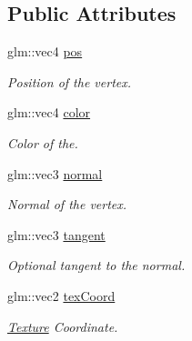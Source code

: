 \subsection*{Public Attributes}
\begin{DoxyCompactItemize}
\item 
\mbox{\label{struct_vertex_a516f575596de99880ec990ac15027f94}} 
glm\+::vec4 \mbox{\hyperlink{struct_vertex_a516f575596de99880ec990ac15027f94}{pos}}
\begin{DoxyCompactList}\small\item\em Position of the vertex. \end{DoxyCompactList}\item 
\mbox{\label{struct_vertex_aa7ecd21578677765699b8831e0011696}} 
glm\+::vec4 \mbox{\hyperlink{struct_vertex_aa7ecd21578677765699b8831e0011696}{color}}
\begin{DoxyCompactList}\small\item\em Color of the. \end{DoxyCompactList}\item 
\mbox{\label{struct_vertex_a3aa35fe84025ecf1acccb5f65f5577fd}} 
glm\+::vec3 \mbox{\hyperlink{struct_vertex_a3aa35fe84025ecf1acccb5f65f5577fd}{normal}}
\begin{DoxyCompactList}\small\item\em Normal of the vertex. \end{DoxyCompactList}\item 
\mbox{\label{struct_vertex_a89587fd853d4f3f42900715620a7364d}} 
glm\+::vec3 \mbox{\hyperlink{struct_vertex_a89587fd853d4f3f42900715620a7364d}{tangent}}
\begin{DoxyCompactList}\small\item\em Optional tangent to the normal. \end{DoxyCompactList}\item 
\mbox{\label{struct_vertex_a8214ff52fee03a5524ce58c3810a1be9}} 
glm\+::vec2 \mbox{\hyperlink{struct_vertex_a8214ff52fee03a5524ce58c3810a1be9}{tex\+Coord}}
\begin{DoxyCompactList}\small\item\em \mbox{\hyperlink{class_texture}{Texture}} Coordinate. \end{DoxyCompactList}\end{DoxyCompactItemize}
